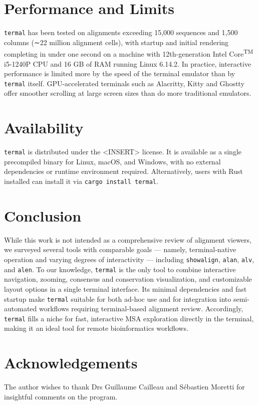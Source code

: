 \documentclass[11pt]{article}
\begin{document}
\section*{Performance and Limits}

\texttt{termal} has been tested on alignments exceeding 15,000 sequences and
1,500 columns (∼22 million alignment cells), with startup and initial rendering
completing in under one second on a machine with 12th-generation
Intel\textregistered{} Core\textsuperscript{TM} i5-1240P CPU and 16 GB of RAM
running Linux 6.14.2. In practice, interactive performance is limited more by
the speed of the terminal emulator than by \texttt{termal} itself.
GPU-accelerated terminals such as Alacritty\cite{alacritty}, Kitty\cite{kitty}
and Ghostty\cite{ghostty} offer smoother scrolling at large screen sizes than do
more traditional emulators.

\section*{Availability}

\texttt{termal} is distributed under the <INSERT> license. It is available as a
single precompiled binary for Linux, macOS, and Windows, with no external
dependencies or runtime environment required. Alternatively, users with Rust
installed can install it via \texttt{cargo install termal}.

\section*{Conclusion}

While this work is not intended as a comprehensive review of alignment viewers,
we surveyed several tools with comparable goals — namely, terminal-native
operation and varying degrees of interactivity — including \texttt{showalign},
\texttt{alan}, \texttt{alv}, and \texttt{alen}.  To our knowledge,
\texttt{termal} is the only tool to combine interactive navigation, zooming,
consensus and conservation visualization, and customizable layout options in a
single terminal interface.  Its minimal dependencies and fast startup make
\texttt{termal} suitable for both ad-hoc use and for integration into
semi-automated workflows requiring terminal-based alignment review. Accordingly,
\texttt{termal} fills a niche for fast, interactive MSA exploration directly in
the terminal, making it an ideal tool for remote bioinformatics workflows.

\section*{Acknowledgements}

The author wishes to thank Drs Guillaume Cailleau and Sébastien Moretti for
insightful comments on the program.


\end{document}
